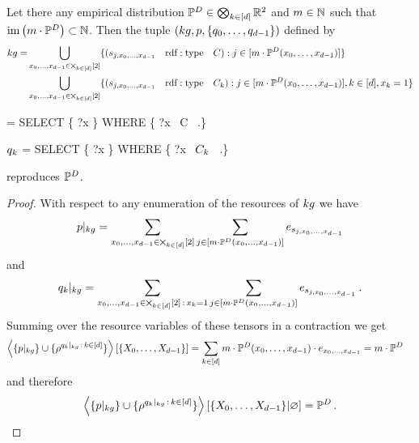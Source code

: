 \begin{theorem}
	Let there any empirical distribution $\mathbb{P}^{D}\in\bigotimes_{k\in[d]}\mathbb{R}^2$ and $m\in\mathbb{N}$ such that $\mathrm{im}\left(m\cdot\mathbb{P}^{D}\right)\subset\mathbb{N}$.
	Then the tuple $(kg,p,\{q_{0},\ldots,q_{d-1}\})$ defined by
	\begin{align}
		kg =
		& \bigcup_{{x_{0},\ldots,x_{d-1}}\in\bigtimes_{k\in[d]}[2]}  \{(
			s_{j, {x_{0},\ldots,x_{d-1}}} \quad \mathrm{rdf:type} \quad C ) : j \in [m\cdot\mathbb{P}^{D}({x_{0},\ldots,x_{d-1}})] \}  \\
		&\bigcup_{{x_{0},\ldots,x_{d-1}}\in\bigtimes_{k\in[d]}[2]}  \{(
			s_{j, {x_{0},\ldots,x_{d-1}}} \quad \mathrm{rdf:type} \quad C_k
		) :  j \in [m\cdot\mathbb{P}^{D}({x_{0},\ldots,x_{d-1}})], k\in[d] , x_{k}=1\} 
	\end{align}
	\begin{centeredcode}
		\impformula = SELECT \{ ?x \} WHERE \{ ?x \quad \rdftype \quad C \, .\}
	\end{centeredcode}
	\begin{centeredcode}
		$q_{k}$ = SELECT \{ ?x \} WHERE \{ ?x \quad \rdftype \quad $C_k$ \, .\}
	\end{centeredcode}
	reproduces $\mathbb{P}^{D}$.
\end{theorem}
\begin{proof}
	With respect to any enumeration of the resources of $kg$ we have
	\begin{align}
		{p}|_{kg} 
		= \sum_{{x_{0},\ldots,x_{d-1}}\in\bigtimes_{k\in[d]}[2]} \sum_{j \in [m\cdot\mathbb{P}^{D}({x_{0},\ldots,x_{d-1}})]} e_{s_{j, {x_{0},\ldots,x_{d-1}}} } 
	\end{align}
	and
	\begin{align}
		{q_{k}}|_{kg} 
		= \sum_{{x_{0},\ldots,x_{d-1}}\in\bigtimes_{k\in[d]}[2] \, : \, x_{k} = 1} \sum_{j \in [m\cdot\mathbb{P}^{D}({x_{0},\ldots,x_{d-1}})]} e_{s_{j, {x_{0},\ldots,x_{d-1}}} } \, . 
	\end{align}
	Summing over the resource variables of these tensors in a contraction we get
	\begin{align}
		\left\langle \{{p}|_{kg}\}\cup\{\rho^{{q_{k}}|_{kg}\, : \, k\in[d]}\}\right\rangle \left[ \{X_{0},\ldots,X_{d-1}\} \right]
		& = \sum_{k\in[d]}  m\cdot\mathbb{P}^{D}({x_{0},\ldots,x_{d-1}}) \cdot e_{{x_{0},\ldots,x_{d-1}}} = m \cdot \mathbb{P}^{D} 
	\end{align}
	and therefore
	\begin{align}
		\left\langle \{{p}|_{kg}\}\cup\{\rho^{{q_{k}}|_{kg}\, : \, k\in[d]}\}\right\rangle \left[ \{X_{0},\ldots,X_{d-1}\} | \varnothing \right] = \mathbb{P}^{D} \, . 
	\end{align}
\end{proof}

